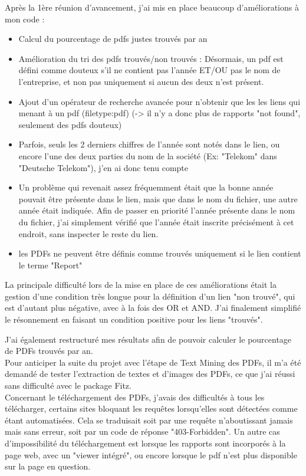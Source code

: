 Après la 1ère réunion d'avancement, j'ai mis en place beaucoup d'améliorations à mon code :
\begin{itemize}
    \item Calcul du pourcentage de pdfs justes trouvés par an
    \item Amélioration du tri des pdfs trouvés/non trouvés : Désormais, un pdf est défini comme douteux s'il ne contient pas l'année ET/OU pas le nom de l'entreprise, et non pas uniquement si aucun des deux n'est présent.
    \item Ajout d'un opérateur de recherche avancée pour n'obtenir que les les liens qui menant à un pdf (filetype:pdf) (-> il n'y a donc plus de rapports "not found", seulement des pdfs douteux)
    \item Parfois, seuls les 2 derniers chiffres de l'année sont notés dans le lien, ou encore l'une des deux parties du nom de la société (Ex: "Telekom" dans "Deutsche Telekom"), j'en ai donc tenu compte
    \item Un problème qui revenait assez fréquemment était que la bonne année pouvait être présente dans le lien, mais que dans le nom du fichier, une autre année était indiquée. Afin de passer en priorité l'année présente dans le nom du fichier, j'ai simplement vérifié que l'année était inscrite précisément à cet endroit, sans inspecter le reste du lien.
    \item les PDFs ne peuvent être définis comme trouvés uniquement si le lien contient le terme "Report"
\end{itemize}

La principale difficulté lors de la mise en place de ces améliorations était la gestion d'une condition très longue pour la définition d'un lien "non trouvé", qui est d'autant plus négative, avec à la fois des OR et AND.
J'ai finalement simplifié le résonnement en faisant un condition positive pour les liens "trouvés".

J'ai également restructuré mes résultats afin de pouvoir calculer le pourcentage de PDFs trouvés par an.
\\

Pour anticiper la suite du projet avec l'étape de Text Mining des PDFs, il m'a été demandé de tester l'extraction de textes et d'images des PDFs, ce que j'ai réussi sans difficulté avec le package Fitz.
\\

Concernant le téléchargement des PDFs, j'avais des difficultés à tous les télécharger, certains sites bloquant les requêtes lorsqu'elles sont détectées comme étant automatisées.
Cela se traduisait soit par une requête n'aboutissant jamais mais sans erreur, soit par un code de réponse "403-Forbidden".
Un autre cas d'impossibilité du téléchargement est lorsque les rapports sont incorporés à la page web, avec un "viewer intégré", ou encore lorsque le pdf n'est plus disponible sur la page en question.

